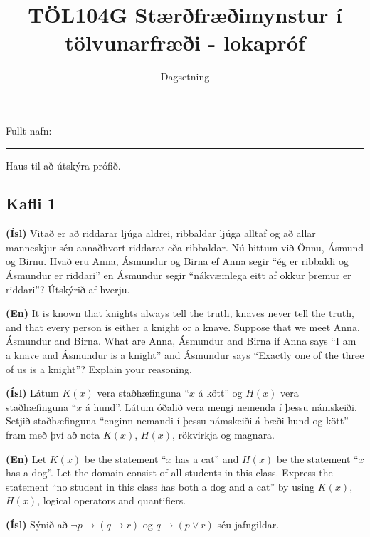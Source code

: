 \documentclass[addpoints]{exam}
\author{}
\date{}
\title{TÖL104G Stærðfræðimynstur í tölvunarfræði - lokapróf}
\author{}
\date{Dagsetning}
\begin{document}
Fullt nafn: \vspace*{1mm} \hrule

\begin{center}
\begin{minipage}{.8\textwidth}
Haus til að útskýra prófið.
\end{minipage}
\end{center}

\vspace{1cm}

\begin{questions}

\section{Kafli 1}

\question[10] \textbf{(Ísl)} Vitað er að riddarar ljúga aldrei, ribbaldar ljúga alltaf og að allar manneskjur séu annaðhvort riddarar eða ribbaldar. Nú hittum við Önnu, Ásmund og Birnu. Hvað eru Anna, Ásmundur og Birna ef Anna segir ``ég er ribbaldi og Ásmundur er riddari'' en Ásmundur segir ``nákvæmlega eitt af okkur þremur er riddari''? Útskýrið af hverju.

\textbf{(En)} It is known that knights always tell the truth, knaves never tell the truth, and that every person is either a knight or a knave. Suppose that we meet Anna, Ásmundur and Birna. What are Anna, Ásmundur and Birna if Anna says ``I am a knave and Ásmundur is a knight'' and Ásmundur says ``Exactly one of the three of us is a knight''? Explain your reasoning.


\question[10] \textbf{(Ísl)} Látum $K(x)$ vera staðhæfinguna ``$x$ á kött'' og $H(x)$ vera staðhæfinguna ``$x$ á hund''. Látum óðalið vera mengi nemenda í þessu námskeiði. Setjið staðhæfinguna ``enginn nemandi í þessu námskeiði á bæði hund og kött'' fram með því að nota $K(x)$, $H(x)$, rökvirkja og magnara.
 
\textbf{(En)} Let $K(x)$ be the statement ``$x$ has a cat'' and $H(x)$ be the statement ``$x$ has a dog''. Let the domain consist of all students in this class. Express the statement ``no student in this class has both a dog and a cat'' by using $K(x)$, $H(x)$, logical operators and quantifiers.

\question[10]
\textbf{(Ísl)} Sýnið að $\lnot p \to (q \to r)$ og $q \to (p \lor r)$ séu jafngildar.


\end{questions}
\end{document}
